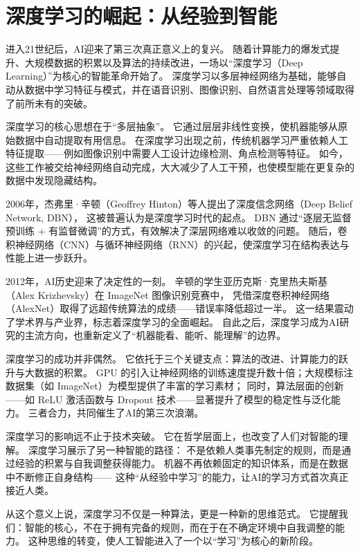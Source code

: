 \section{深度学习的崛起：从经验到智能}

进入21世纪后，AI迎来了第三次真正意义上的复兴。  
随着计算能力的爆发式提升、大规模数据的积累以及算法的持续改进，一场以“深度学习（Deep Learning）”为核心的智能革命开始了。  
深度学习以多层神经网络为基础，能够自动从数据中学习特征与模式，并在语音识别、图像识别、自然语言处理等领域取得了前所未有的突破。

深度学习的核心思想在于“多层抽象”。  
它通过层层非线性变换，使机器能够从原始数据中自动提取有用信息。  
在深度学习出现之前，传统机器学习严重依赖人工特征提取——例如图像识别中需要人工设计边缘检测、角点检测等特征。  
如今，这些工作被交给神经网络自动完成，大大减少了人工干预，也使模型能在更复杂的数据中发现隐藏结构。

2006年，杰弗里·辛顿（Geoffrey Hinton）等人提出了深度信念网络（Deep Belief Network, DBN），  
这被普遍认为是深度学习时代的起点。  
DBN 通过“逐层无监督预训练 + 有监督微调”的方式，有效解决了深层网络难以收敛的问题。  
随后，卷积神经网络（CNN）与循环神经网络（RNN）的兴起，使深度学习在结构表达与性能上进一步跃升。

2012年，AI历史迎来了决定性的一刻。  
辛顿的学生亚历克斯·克里热夫斯基（Alex Krizhevsky）在 ImageNet 图像识别竞赛中，  
凭借深度卷积神经网络（AlexNet）取得了远超传统算法的成绩——错误率降低超过一半。  
这一结果震动了学术界与产业界，标志着深度学习的全面崛起。  
自此之后，深度学习成为AI研究的主流方向，也重新定义了“机器能看、能听、能理解”的边界。

深度学习的成功并非偶然。  
它依托于三个关键支点：算法的改进、计算能力的跃升与大数据的积累。  
GPU 的引入让神经网络的训练速度提升数十倍；大规模标注数据集（如 ImageNet）为模型提供了丰富的学习素材；  
同时，算法层面的创新——如 ReLU 激活函数与 Dropout 技术——显著提升了模型的稳定性与泛化能力。  
三者合力，共同催生了AI的第三次浪潮。

深度学习的影响远不止于技术突破。  
它在哲学层面上，也改变了人们对智能的理解。  
深度学习展示了另一种智能的路径：  
不是依赖人类事先制定的规则，而是通过经验的积累与自我调整获得能力。  
机器不再依赖固定的知识体系，而是在数据中不断修正自身结构——  
这种“从经验中学习”的能力，让AI的学习方式首次真正接近人类。

从这个意义上说，深度学习不仅是一种算法，更是一种新的思维范式。  
它提醒我们：智能的核心，不在于拥有完备的规则，而在于在不确定环境中自我调整的能力。  
这种思维的转变，使人工智能进入了一个以“学习”为核心的新阶段。

